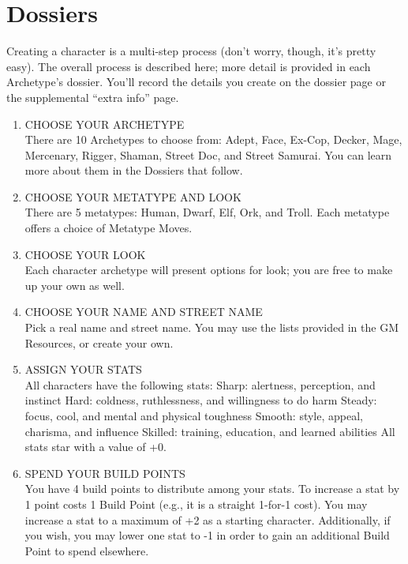 \chapter{Dossiers} \label{dossiers}

Creating a character is a multi-step process (don’t worry, though, it’s pretty easy). The overall process is described here; more detail is provided in each Archetype’s dossier. You’ll record the details you create on the dossier page or the supplemental “extra info” page.

\begin{enumerate}
\item CHOOSE YOUR ARCHETYPE \\
There are 10 Archetypes to choose from: Adept, Face, Ex-Cop, Decker, Mage, Mercenary, Rigger, Shaman, Street Doc, and Street Samurai. You can learn more about them in the Dossiers that follow.

\item CHOOSE YOUR METATYPE AND LOOK \\
There are 5 metatypes: Human, Dwarf, Elf, Ork, and Troll. Each metatype offers a choice of Metatype Moves.

\item CHOOSE YOUR LOOK \\
Each character archetype will present options for look; you are free to make up your own as well.

\item CHOOSE YOUR NAME AND STREET NAME \\
Pick a real name and street name. You may use the lists provided in the GM Resources, or create your own.

\item ASSIGN YOUR STATS \\
All characters have the following stats:
Sharp: alertness, perception, and instinct
Hard: coldness, ruthlessness, and willingness to do harm
Steady: focus, cool, and mental and physical toughness
Smooth: style, appeal, charisma, and influence
Skilled: training, education, and learned abilities
All stats star with a value of +0.

\item SPEND YOUR BUILD POINTS \\
You have 4 build points to distribute among your stats. To increase a stat by 1 point costs 1 Build Point (e.g., it is a straight 1-for-1 cost). You may increase a stat to a maximum of +2 as a starting character. Additionally, if you wish, you may lower one stat to -1 in order to gain an additional Build Point to spend elsewhere.


\end{enumerate}
